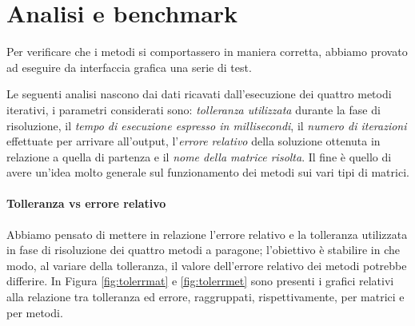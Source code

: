 \section{Analisi e benchmark}

Per verificare che i metodi si comportassero in maniera corretta, abbiamo provato ad eseguire da interfaccia grafica una serie di test.

Le seguenti analisi nascono dai dati ricavati dall'esecuzione dei quattro metodi iterativi, i parametri considerati sono: \textit{tolleranza utilizzata} durante la fase di risoluzione, il \textit{tempo di esecuzione espresso in millisecondi}, il \textit{numero di iterazioni} effettuate per arrivare all'output, l'\textit{errore relativo} della soluzione ottenuta in relazione a quella di partenza e il \textit{nome della matrice risolta}. Il fine è quello di avere un'idea molto generale sul funzionamento dei metodi sui vari tipi di matrici.


\paragraph{Tolleranza vs errore relativo}
Abbiamo pensato di mettere in relazione l'errore relativo e la tolleranza utilizzata in fase di risoluzione dei quattro metodi a paragone; l'obiettivo è stabilire in che modo, al variare della tolleranza, il valore dell'errore relativo dei metodi potrebbe differire. In Figura \ref{fig:tolerrmat} e \ref{fig:tolerrmet} sono presenti i grafici relativi alla relazione tra tolleranza ed errore, raggruppati, rispettivamente, per matrici e per metodi.



